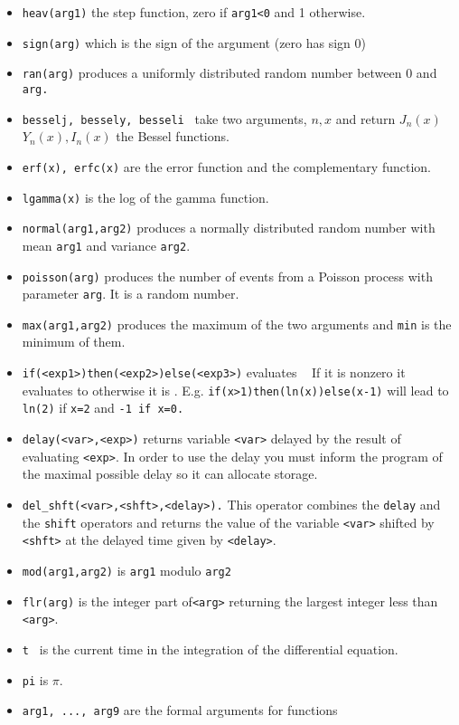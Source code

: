 \begin{itemize}\itemsep -.05in
\item {\tt heav(arg1)} the step function, zero if {\tt arg1<0} and 1 otherwise.
\item {\tt sign(arg)} which is the sign of the argument (zero has sign 0)
\item {\tt ran(arg)} produces a uniformly distributed random number
between 0 and {\tt arg.}
\item {\tt besselj, bessely, besseli  } take two arguments, $n,x$ and return
$J_n(x)$ $Y_n(x),I_n(x)$ the Bessel functions.
\item { \tt erf(x), erfc(x)} are the error function and the
complementary function. 
\item {\tt lgamma(x)} is the log of the gamma function. 
\item {\tt normal(arg1,arg2)} produces a normally distributed random number
with mean {\tt arg1}  and variance {\tt arg2}.
\item {\tt poisson(arg)} produces the number of events from a Poisson process with parameter {\tt arg}.  It is a random number.  
\item {\tt max(arg1,arg2)} produces the maximum of the two arguments
and {\tt min}  is 
the minimum of them.
\item {\tt if(<exp1>)then(<exp2>)else(<exp3>)} evaluates {\tt <exp1> }
If it is nonzero 
it evaluates to {\tt <exp2>} otherwise it is { \tt <exp3>}.  E.g. {\tt if(x>1)then(ln(x))else(x-1)}
will lead to {\tt ln(2)}  if {\tt x=2}  and { \tt -1 if x=0.}
\item {\tt delay(<var>,<exp>)} returns variable {\tt <var>} delayed by the result of
 evaluating {\tt <exp>}.  In order to use the delay you must inform
the program of the maximal possible delay so it can allocate storage.
\item {\tt del\_shft(<var>,<shft>,<delay>).} This operator combines the
{\tt delay} and the {\tt shift} operators and returns the value of the
variable {\tt <var>} shifted by {\tt <shft>} at the delayed time given
by {\tt <delay>}.
\item {\tt mod(arg1,arg2)} is {\tt arg1} modulo {\tt arg2}
\item {\tt  flr(arg)}  is the integer part of{\tt  <arg>} returning the largest integer less than {\tt <arg>}.  
\item  {\tt t } is the current time in the integration of the differential equation.
\item {\tt  pi}  is $\pi.$ 
\item {\tt arg1, ..., arg9} are the formal arguments for functions 

\end{itemize}
